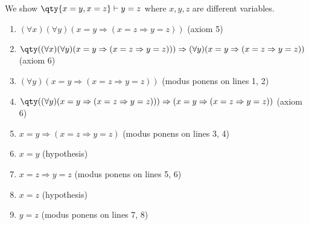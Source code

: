 \begin{example}
    We show \( \qty{x = y, x = z} \vdash y = z \) where \( x, y, z \) are different variables.
    \begin{enumerate}
        \item \( (\forall x)(\forall y)(x = y \Rightarrow (x = z \Rightarrow y = z)) \) (axiom 5)
        \item \( \qty((\forall x)(\forall y)(x = y \Rightarrow (x = z \Rightarrow y = z))) \Rightarrow (\forall y)(x = y \Rightarrow (x = z \Rightarrow y = z)) \) (axiom 6)
        \item \( (\forall y)(x = y \Rightarrow (x = z \Rightarrow y = z)) \) (modus ponens on lines 1, 2)
        \item \( \qty((\forall y)(x = y \Rightarrow (x = z \Rightarrow y = z))) \Rightarrow (x = y \Rightarrow (x = z \Rightarrow y = z)) \) (axiom 6)
        \item \( x = y \Rightarrow (x = z \Rightarrow y = z) \) (modus ponens on lines 3, 4)
        \item \( x = y \) (hypothesis)
        \item \( x = z \Rightarrow y = z \) (modus ponens on lines 5, 6)
        \item \( x = z \) (hypothesis)
        \item \( y = z \) (modus ponens on lines 7, 8)
    \end{enumerate}
\end{example}

